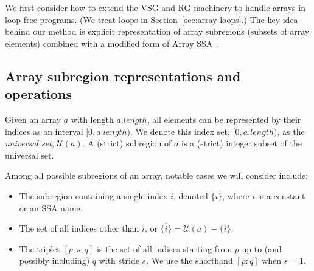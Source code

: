 \newcommand{\arraylen}{\ensuremath{a.length}\xspace}
\newcommand{\EquivRange}[3]{\ensuremath{(#1\equiv#2)@#3}\xspace}

We first consider how to extend the VSG and RG machinery to handle arrays in loop-free programs.
(We treat loops in Section~\ref{sec:array-loops}.)
The key idea behind our method is explicit representation of array subregions (subsets of array elements) combined with a modified form of Array SSA~\cite{rus2006scalable}.

\subsection{Array subregion representations and operations}

Given an array $a$ with length \arraylen, all elements can be represented by their indices as an interval $[0,\arraylen)$.
We denote this index set, $[0,\arraylen)$, as the \emph{universal set}, $\mathcal{U}(a)$.
A (strict) subregion of $a$ is a (strict) integer subset of the universal set.

Among all possible subregions of an array, notable cases we will consider include:
%
\begin{itemize}
\item The subregion containing a single index $i$, denoted $\{i\}$, where $i$ is a constant or an SSA name.
\item The set of all indices other than $i$, or $\overline{\{i\}} = \mathcal{U}(a)-\{i\}$.

\item The triplet $[p:s:q]$ is the set of all indices starting from $p$ up to (and possibly including) $q$ with stride $s$. We use the shorthand $[p:q]$ when $s=1$.
\end{itemize}

